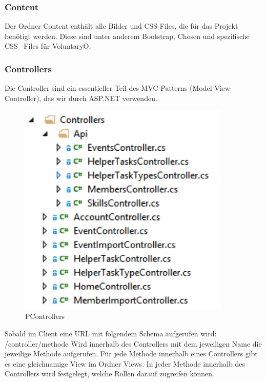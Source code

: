 		\subsubsection{Content}
			Der Ordner Content enthält alle Bilder und CSS-Files, die für das Projekt benötigt werden. Diese sind unter anderem Bootstrap, Chosen und spezifische CSS –Files für VoluntaryO.

		\subsubsection{Controllers}
			Die Controller sind ein essentieller Teil des MVC-Patterns (Model-View-Controller), das wir durch ASP.NET verwenden.

			\begin{figure}[h]
		  		\vspace{-5pt}
		    	\centering
		    	 \includegraphics[width=0.9\textwidth]{content/architekturdokumentation/images/web-2-Controllers.png}
		  		\vspace{-25pt}
				\caption{PControllers}
			\end{figure}

			Sobald im Client eine URL mit folgendem Schema aufgerufen wird:
			/{controller}/{methode}
			Wird innerhalb des Controllers mit dem jeweiligen Name die jeweilige Methode aufgerufen. Für jede Methode innerhalb eines Controllers gibt es eine gleichnamige View im Ordner Views.
			In jeder Methode innerhalb des Controllers wird festgelegt, welche Rollen darauf zugreifen können.

